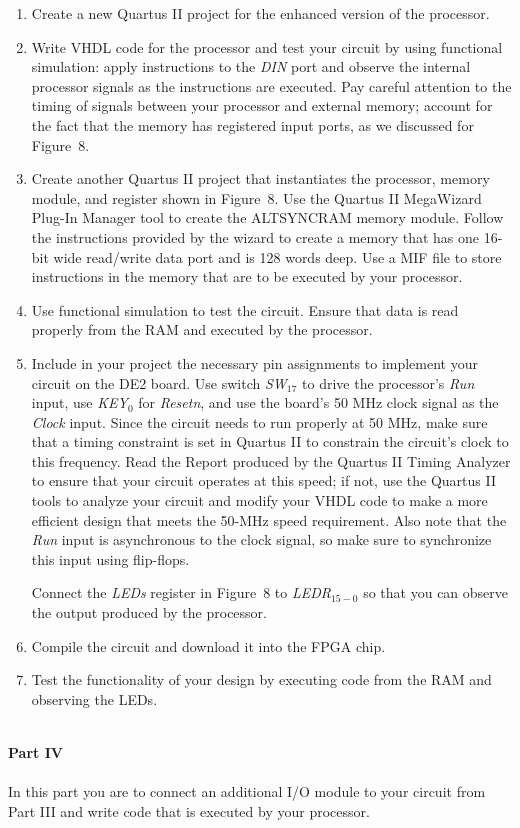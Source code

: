 \documentclass[epsfig,10pt,fullpage]{article}
\begin{document}
\begin{enumerate}
\item Create a new Quartus II project for the enhanced version of the processor.
\item Write VHDL code for the processor and test your circuit by using functional
simulation: apply instructions to the {\it DIN} port and observe the internal processor
signals as the instructions are executed. Pay careful attention to the timing of 
signals between your processor and external memory; account for the fact that the 
memory has registered input ports, as we discussed for Figure~8. 
\item Create another Quartus II project that instantiates the processor, memory module, and
register shown in Figure~8. Use the Quartus II MegaWizard Plug-In Manager tool to 
create the ALTSYNCRAM memory module. Follow the
instructions provided by the wizard to create a memory that has one 16-bit wide read/write
data port and is 128 words deep. Use a MIF file to store instructions in the 
memory that are to be executed by your processor.
\item Use functional simulation to test the circuit. Ensure that data is read properly
from the RAM and executed by the processor.
\item Include in your project the necessary pin assignments to implement your circuit on the DE2
board. Use switch {\it SW}$_{17}$ to drive the processor's {\it Run} input, use 
{\it KEY}$_0$ for {\it Resetn}, and use the board's 50 MHz clock signal 
as the {\it Clock} input. Since the circuit needs to run properly at 50 MHz, make sure that
a timing constraint is set in Quartus II to constrain the circuit's clock to this
frequency. Read the Report produced by the Quartus II Timing Analyzer to ensure that
your circuit operates at this speed; if not, use the Quartus II tools to analyze your
circuit and modify your VHDL code to make a more efficient design that meets the 50-MHz
speed requirement. Also note that the {\it Run} input is asynchronous to the clock signal,
so make sure to synchronize this input using flip-flops.

Connect the {\it LEDs} register in Figure~8 to {\it LEDR}$_{15-0}$ so that you can 
observe the output produced by the processor.
\item Compile the circuit and download it into the FPGA chip.
\item Test the functionality of your design by executing code from the RAM
and observing the LEDs. 
\end{enumerate}
~\\
\noindent
{\bf Part IV}
~\\
~\\
\noindent
In this part you are to connect an additional I/O module to your circuit from Part III
and write code that is executed by your processor.
\end{document}
